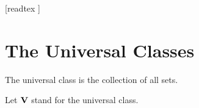 \documentclass[10pt]{article}
\begin{document}
  \begin{imports}
    \begin{forthel}
      [readtex ]
    \end{forthel}
  \end{imports}


  \section*{The Universal Classes}

  \begin{forthel}
    \begin{definition}[id=FOUNDATIONS_10_9625487120366325,printid]
      The universal class is the collection of all sets.
    \end{definition}

    Let $\textbf{V}$ stand for the universal class.
  \end{forthel}
\end{document}
